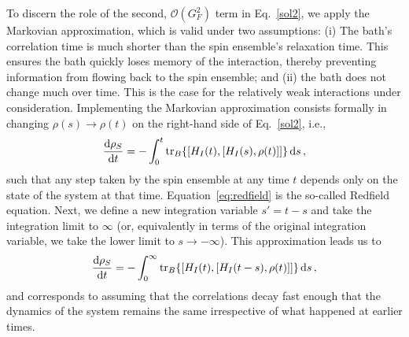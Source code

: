 \documentclass[aps,prd,10pt,twocolumn,superscriptaddress,floatfix,nofootinbib,amsmath,amssymb,altaffilletter,preprintnumbers]{revtex4-1}
\begin{document}
To discern the role of the second, $\mathcal{O}(G_F^2)$ term in Eq.~\eqref{sol2}, we apply the Markovian approximation, which is valid under two assumptions: (i) The bath's correlation time is much shorter than the spin ensemble's relaxation time. This ensures the bath quickly loses memory of the interaction, thereby preventing information from flowing back to the spin ensemble; and (ii) the bath does not change much over time. This is the case for the relatively weak interactions under consideration.   Implementing the Markovian approximation consists formally in changing $\rho(s)\rightarrow\rho(t)$ on the right-hand side of Eq.~\eqref{sol2}, i.e., 
\begin{equation}
     \frac{\mathrm{d} \rho_S}{\mathrm{d}t}=  -\int_0^t\text{tr}_B\{[H_I(t),[H_I(s),\rho(t)]]\}\, {\rm d}s \,,
     \label{eq:redfield}
\end{equation}
such that any step taken by the spin ensemble at any time $t$ depends only on the state of the system at that time.  Equation~\eqref{eq:redfield} is the so-called Redfield equation.
Next, we define a new integration variable $s'= t-s$ and take the integration limit to $\infty$ (or, equivalently in terms of the original integration variable, we take the lower limit to $s \to - \infty$).  This approximation leads us to
\begin{equation}
     \frac{\mathrm{d} \rho_S}{\mathrm{d}t}  =-\int_0^\infty\text{tr}_B\{[H_I(t),[H_I(t-s),\rho(t)]]\} \, {\rm d}s\, ,
     \label{eq:changevariable}
\end{equation}
and corresponds to assuming that the correlations decay fast enough that the dynamics of the system remains the same irrespective of what happened at earlier times.
\end{document}
